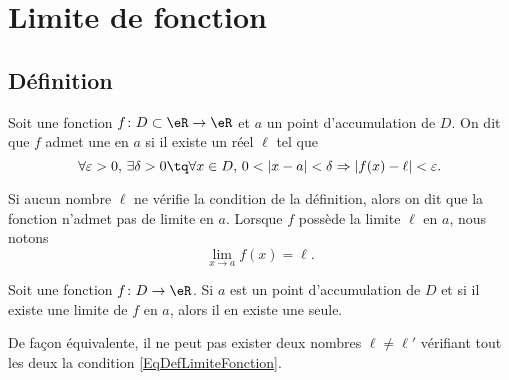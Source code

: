 \section{Limite de fonction}
\label{SecLimiteFontion}

\subsection{Définition}

\begin{definition}	\label{DefLimiteFonction}
	Soit une fonction $f\colon D\subset\eR\to \eR$ et $a$ un point d'accumulation de $D$. On dit que $f$ admet une  en $a$ si il existe un réel $\ell$ tel que 
	\begin{equation}\label{EqDefLimiteFonction}
		\forall\varepsilon>0,\,\exists\delta>0\tq \forall x\in D,\, 0<| x-a |<\delta\Rightarrow| f(x)-\ell |<\varepsilon.
	\end{equation}
\end{definition}

Si aucun nombre $\ell$ ne vérifie la condition de la définition, alors on dit que la fonction n'admet pas de limite en $a$. Lorsque $f$ possède la limite $\ell$ en $a$, nous notons
\begin{equation}
	\lim_{x\to a} f(x)=\ell.
\end{equation}

\begin{proposition}
	Soit une fonction $f\colon D\to \eR$. Si $a$ est un point d'accumulation de $D$ et si il existe une limite de $f$ en $a$, alors il en existe une seule. 
\end{proposition}

De façon équivalente, il ne peut pas exister deux nombres $\ell\neq\ell'$ vérifiant tout les deux la condition \eqref{EqDefLimiteFonction}.

